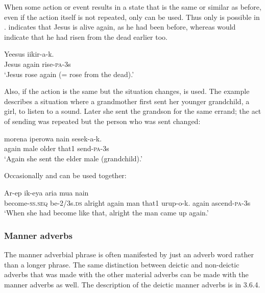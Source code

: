 When some action or event results in a state that is the same or similar as before, even if the action itself is not repeated, only\textstyleStyleVernacularWordsItalic{}  can be used. Thus only  is possible in .  indicates that Jesus is alive again, as he had been before, whereas  would indicate that he had risen from the dead earlier too.

\ea%
\label{ex:3:x503}
\gll Yeesus  iikir-a-k. \\
Jesus again rise-\textsc{pa}-3s\\
\glt`Jesus rose again (= rose from the dead).'
\z

Also, if the action is the same but the situation changes,  is used. The example  describes a situation where a grandmother first sent her younger grandchild, a girl, to listen to a sound. Later she sent the grandson for the same errand; the act of sending was repeated but the person who was sent changed:

\ea%
\label{ex:3:x1761}
\gll {} morena iperowa nain sesek-a-k. \\
again male older that1 send-\textsc{pa}-3s\\
\glt`Again she sent the elder male (grandchild).'
\z

Occasionally  and  can be used together:

\ea%
\label{ex:3:x700}
\gll Ar-ep ik-eya aria  mua nain \\
become-\textsc{ss}.\textsc{seq} be-2/3s.\textsc{ds} alright again man that1
 urup-o-k.
again ascend-\textsc{pa}-3s\\
\glt`When she had become like that, alright the man came up again.'
\z

\subsubsection{Manner adverbs}\label{sec:3.9.1.3}
{}
The manner adverbial phrase is often manifested by just an adverb word rather than a longer phrase. The same distinction between deictic and non-deictic adverbs that was made with the other material adverbs can be made with the manner adverbs as well. The description of the deictic manner adverbs is in 3.6.4.

